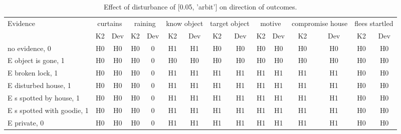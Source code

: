 \begin{table}\begin{tabular}{l|cc|cc|cc|cc|cc|cc|cc}\toprule\multirow{2}{*}{Evidence} & \multicolumn{2}{c}{curtains}& \multicolumn{2}{c}{raining}& \multicolumn{2}{c}{know object}& \multicolumn{2}{c}{target object}& \multicolumn{2}{c}{motive}& \multicolumn{2}{c}{compromise house}& \multicolumn{2}{c}{flees startled}\\& {K2} & {Dev}& {K2} & {Dev}& {K2} & {Dev}& {K2} & {Dev}& {K2} & {Dev}& {K2} & {Dev}& {K2} & {Dev}\\\midrule
no evidence, 0 & H0&H0&\cellcolor{Bittersweet}H0&\cellcolor{Bittersweet}0&H1&H1&H0&H0&H0&H0&H0&H0&H0&H0\\E object is gone, 1 & H0&H0&\cellcolor{Bittersweet}H0&\cellcolor{Bittersweet}0&H0&H0&H0&H0&H0&H0&H0&H0&H0&H0\\E broken lock, 1 & H0&H0&\cellcolor{Bittersweet}H0&\cellcolor{Bittersweet}0&H1&H1&H1&H1&H1&H1&H1&H1&H0&H0\\E disturbed house, 1 & H0&H0&\cellcolor{Bittersweet}H0&\cellcolor{Bittersweet}0&H1&H1&H1&H1&H1&H1&H1&H1&H0&H0\\E s spotted by house, 1 & H0&H0&\cellcolor{Bittersweet}H0&\cellcolor{Bittersweet}0&H1&H1&H1&H1&H1&H1&H1&H1&H0&H0\\E s spotted with goodie, 1 & H0&H0&\cellcolor{Bittersweet}H0&\cellcolor{Bittersweet}0&H1&H1&H1&H1&H1&H1&H1&H1&H0&H0\\E private, 0 & H0&H0&\cellcolor{Bittersweet}H0&\cellcolor{Bittersweet}0&H1&H1&H1&H1&H1&H1&H1&H1&H0&H0\\\bottomrule\end{tabular}\caption{Effect of disturbance of [0.05, 'arbit'] on direction of outcomes.}\end{table}